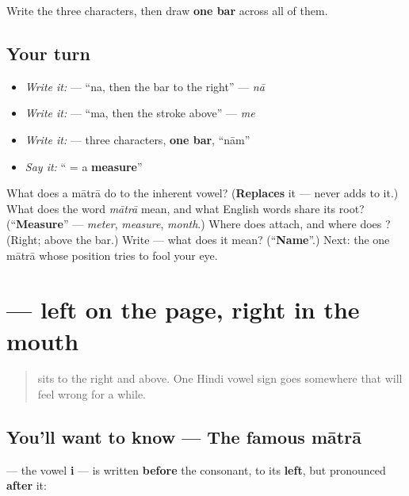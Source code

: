 Write the three characters, then draw \textbf{one bar} across all of them.

\subsection*{Your turn}
\begin{itemize}
\raggedright
  \item \emph{Write it:}  — \textquotedblleft{}na, then the bar to the right\textquotedblright{} — \emph{nā}
  \item \emph{Write it:}  — \textquotedblleft{}ma, then the stroke above\textquotedblright{} — \emph{me}
  \item \emph{Write it:} \textbf{} — three characters, \textbf{one bar}, \textquotedblleft{}nām\textquotedblright{}
  \item \emph{Say it:} \textquotedblleft{}\textbf{} = a \textbf{measure}\textquotedblright{}
\end{itemize}

\begin{tcolorbox}[breakable,colback=teal!4,colframe=teal!35!black,title={Before you move on}]
What does a mātrā do to the inherent vowel? (\textbf{Replaces} it — never adds to it.) What does the word \emph{mātrā} mean, and what English words share its root? (\textquotedblleft{}\textbf{Measure}\textquotedblright{} — \emph{meter}, \emph{measure}, \emph{month}.) Where does \textbf{} attach, and where does \textbf{}? (Right; above the bar.) Write \textbf{} — what does it mean? (\textquotedblleft{}\textbf{Name}\textquotedblright{}.) Next: the one mātrā whose position tries to fool your eye.
\end{tcolorbox}
\section[\texorpdfstring{\hi{ि} (i)}{ि (i)}]{ — left on the page, right in the mouth}

\label{lesson:HI-W03-preposed-i}



\begin{quote}
\textbf{} sits to the right and \textbf{} above. One Hindi vowel sign goes somewhere that will feel wrong for a while.
\end{quote}

\subsection*{You'll want to know — The famous mātrā}
\textbf{} — the vowel \textbf{i} — is written \textbf{before} the consonant, to its \textbf{left}, but pronounced \textbf{after} it:

